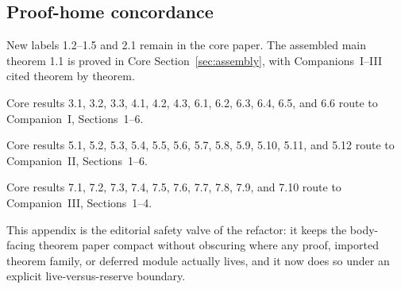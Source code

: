 \subsection*{Proof-home concordance}
\begin{description}[leftmargin=2.2em,style=nextline]
\item[Core-only results.] New labels 1.2--1.5 and 2.1 remain in the core paper. The assembled main theorem 1.1 is proved in Core Section~\ref{sec:assembly}, with Companions~I--III cited theorem by theorem.
\item[Companion~I.] Core results 3.1, 3.2, 3.3, 4.1, 4.2, 4.3, 6.1, 6.2, 6.3, 6.4, 6.5, and 6.6 route to Companion~I, Sections~1--6.
\item[Companion~II.] Core results 5.1, 5.2, 5.3, 5.4, 5.5, 5.6, 5.7, 5.8, 5.9, 5.10, 5.11, and 5.12 route to Companion~II, Sections~1--6.
\item[Companion~III.] Core results 7.1, 7.2, 7.3, 7.4, 7.5, 7.6, 7.7, 7.8, 7.9, and 7.10 route to Companion~III, Sections~1--4.
\end{description}

This appendix is the editorial safety valve of the refactor: it keeps the body-facing theorem paper compact without obscuring where any proof, imported theorem family, or deferred module actually lives, and it now does so under an explicit live-versus-reserve boundary.
